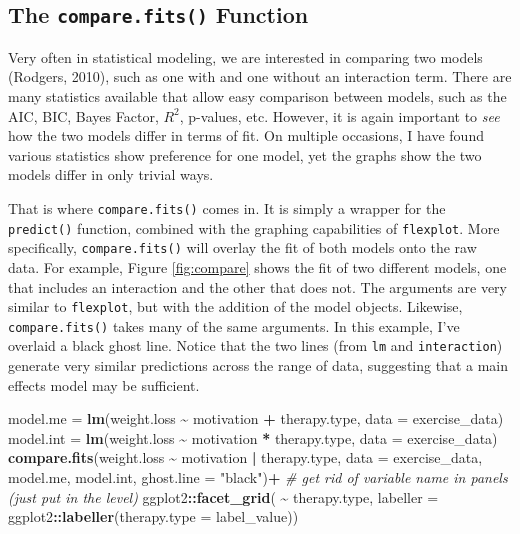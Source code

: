 \documentclass[
  man]{apa6}
\newenvironment{Shaded}{\begin{snugshade}}{\end{snugshade}}
\newcommand{\CommentTok}[1]{\textcolor[rgb]{0.56,0.35,0.01}{\textit{#1}}}
\newcommand{\DataTypeTok}[1]{\textcolor[rgb]{0.13,0.29,0.53}{#1}}
\newcommand{\KeywordTok}[1]{\textcolor[rgb]{0.13,0.29,0.53}{\textbf{#1}}}
\newcommand{\NormalTok}[1]{#1}
\newcommand{\OperatorTok}[1]{\textcolor[rgb]{0.81,0.36,0.00}{\textbf{#1}}}
\newcommand{\StringTok}[1]{\textcolor[rgb]{0.31,0.60,0.02}{#1}}
\begin{document}
\normalsize

\hypertarget{the-compare.fits-function}{%
\subsection{\texorpdfstring{The \texttt{compare.fits()} Function}{The compare.fits() Function}}\label{the-compare.fits-function}}

Very often in statistical modeling, we are interested in comparing two models (Rodgers, 2010), such as one with and one without an interaction term. There are many statistics available that allow easy comparison between models, such as the AIC, BIC, Bayes Factor, \(R^2\), p-values, etc. However, it is again important to \emph{see} how the two models differ in terms of fit. On multiple occasions, I have found various statistics show preference for one model, yet the graphs show the two models differ in only trivial ways.

That is where \texttt{compare.fits()} comes in. It is simply a wrapper for the \texttt{predict()} function, combined with the graphing capabilities of \texttt{flexplot}. More specifically, \texttt{compare.fits()} will overlay the fit of both models onto the raw data. For example, Figure \ref{fig:compare} shows the fit of two different models, one that includes an interaction and the other that does not. The arguments are very similar to \texttt{flexplot}, but with the addition of the model objects. Likewise, \texttt{compare.fits()} takes many of the same arguments. In this example, I've overlaid a black ghost line. Notice that the two lines (from \texttt{lm} and \texttt{interaction}) generate very similar predictions across the range of data, suggesting that a main effects model may be sufficient.

\small

\begin{Shaded}
\begin{Highlighting}[]
\NormalTok{model.me =}\StringTok{ }\KeywordTok{lm}\NormalTok{(weight.loss }\OperatorTok{\textasciitilde{}}\StringTok{ }\NormalTok{motivation }\OperatorTok{+}\StringTok{ }\NormalTok{therapy.type, }\DataTypeTok{data =}\NormalTok{ exercise\_data)}
\NormalTok{model.int =}\StringTok{ }\KeywordTok{lm}\NormalTok{(weight.loss }\OperatorTok{\textasciitilde{}}\StringTok{ }\NormalTok{motivation }\OperatorTok{*}\StringTok{ }\NormalTok{therapy.type, }\DataTypeTok{data =}\NormalTok{ exercise\_data)}
\KeywordTok{compare.fits}\NormalTok{(weight.loss }\OperatorTok{\textasciitilde{}}\StringTok{ }\NormalTok{motivation }\OperatorTok{|}\StringTok{ }\NormalTok{therapy.type, }
             \DataTypeTok{data =}\NormalTok{ exercise\_data, model.me, model.int, }\DataTypeTok{ghost.line =} \StringTok{"black"}\NormalTok{)}\OperatorTok{+}
\StringTok{  }\CommentTok{\# get rid of variable name in panels (just put in the level)}
\StringTok{      }\NormalTok{ggplot2}\OperatorTok{::}\KeywordTok{facet\_grid}\NormalTok{( }\OperatorTok{\textasciitilde{}}\StringTok{ }\NormalTok{therapy.type, }
          \DataTypeTok{labeller =}\NormalTok{ ggplot2}\OperatorTok{::}\KeywordTok{labeller}\NormalTok{(}\DataTypeTok{therapy.type =}\NormalTok{ label\_value))}
\end{Highlighting}
\end{Shaded}
\end{document}
